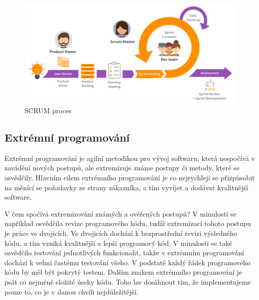 \documentclass[czech,DP]{thesiskiv}
\begin{document}
\begin{figure}[!htb]
    \centering
    \includegraphics[width=\textwidth]{img/scrum.png}
    \caption{SCRUM proces \cite{SCRUMImg}}
    \label{img:SCRUM}
\end{figure}
\FloatBarrier
\subsection{Extrémní programování}
Extrémní programování je agilní metodikou pro vývoj softwaru, která nespočívá v zavádění nových postupů, ale extremizuje známe postupy či metody, které se osvědčily. Hlavním cílem extrémního programování je co nejrychleji se přizpůsobit na měnící se požadavky ze strany zákazníka, a tím vyvíjet a dodávat kvalitnější software.
\par
V čem spočívá extremizování známých a ověřených postupů? V minulosti se například osvědčila revize programového kódu, tudíž extremizací tohoto postupu je práce ve dvojicích. Ve dvojicích dochází k bezprostřední revizi výsledného kódu, a tím vzniká kvalitnější a lepší programový kód. V minulosti se také osvědčilo testování jednotlivých funkcionalit, takže v extrémním programování dochází k velmi častému testování všeho. V podstatě každý řádek programového kódu by měl být pokrytý testem. Dalším znakem extrémního programování je psát co nejméně složité úseky kódu. Toho lze dosáhnout tím, že implementujeme pouze to, co je v danou chvíli nejdůležitější.\cite{metodiky}
\end{document}
